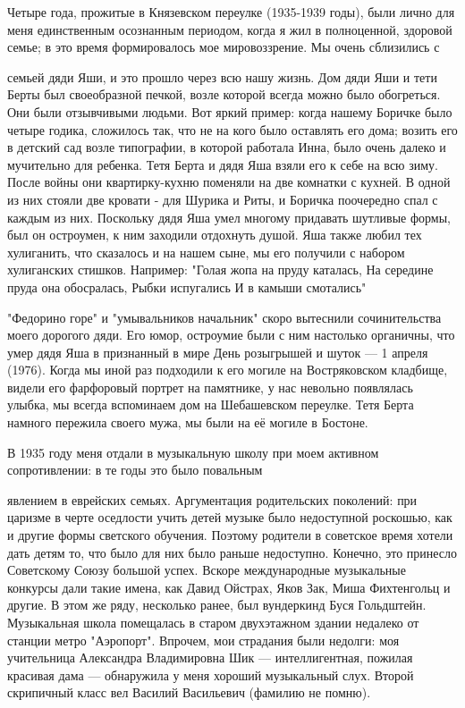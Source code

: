 Четыре года, прожитые в Князевском переулке (1935-1939 годы), были лично для меня единственным осознанным периодом, когда я жил в полноценной, здоровой семье; в это время формировалось мое мировоззрение. Мы очень сблизились с

\label{163-1}
семьей дяди Яши, и это прошло через всю нашу жизнь. Дом дяди Яши и тети Берты был своеобразной печкой, возле которой всегда можно было обогреться. Они были отзывчивыми людьми. Вот яркий пример: когда нашему Боричке было четыре годика, сложилось так, что не на кого было оставлять его дома; возить его в детский сад возле типографии, в которой работала Инна, было очень далеко и мучительно для ребенка. Тетя Берта и дядя Яша взяли его к себе на всю зиму. После войны они квартирку-кухню поменяли на две комнатки с кухней. В одной из них стояли две кровати - для Шурика и Риты, и Боричка поочередно спал с каждым из них. Поскольку дядя Яша умел многому придавать шутливые формы, был он остроумен, к ним заходили отдохнуть душой. Яша также любил тех хулиганить, что сказалось и на нашем сыне, мы его получили с набором хулиганских стишков. Например:
 "Голая жопа на пруду каталась,
 На середине пруда она обосралась,
 Рыбки испугались
 И в камыши смотались"

\label{164-1}
"Федорино горе" и "умывальников начальник" скоро вытеснили сочинительства моего дорогого дяди. Его юмор, остроумие были с ним настолько органичны, что умер дядя Яша в признанный в мире День розыгрышей и шуток — 1 апреля (1976). Когда мы иной раз подходили к его могиле на Востряковском кладбище, видели его фарфоровый портрет на памятнике, у нас невольно появлялась улыбка, мы всегда вспоминаем дом на Шебашевском переулке. Тетя Берта намного пережила своего мужа, мы были на её могиле в Бостоне. 

В 1935 году меня отдали в музыкальную школу при моем активном сопротивлении: в те годы это было повальным 

\label{165-1}
явлением в еврейских семьях. Аргументация родительских поколений: при царизме в черте оседлости учить детей музыке было недоступной роскошью, как и другие формы светского обучения. Поэтому родители в советское время хотели дать детям то, что было для них было раньше недоступно. Конечно, это принесло Советскому Союзу большой успех. Вскоре международные музыкальные конкурсы дали такие имена, как Давид Ойстрах, Яков Зак, Миша Фихтенгольц и другие. В этом же ряду, несколько ранее, был вундеркинд Буся Гольдштейн. Музыкальная школа помещалась в старом двухэтажном здании недалеко от станции метро "Аэропорт". Впрочем, мои страдания были недолги: моя учительница Александра Владимировна Шик — интеллигентная, пожилая красивая дама — обнаружила у меня хороший музыкальный слух. Второй скрипичный класс вел Василий Васильевич (фамилию не помню).

